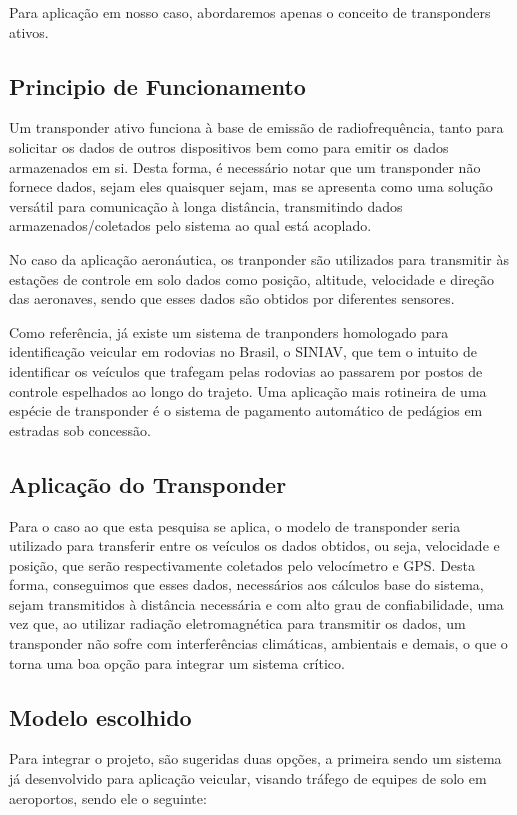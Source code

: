 Para aplicação em nosso caso, abordaremos apenas o conceito de transponders ativos.

\subsection{Principio de Funcionamento}
\label{subs:Principio de Funcionamento}

Um transponder ativo funciona à base de emissão de radiofrequência, tanto para solicitar os dados de outros dispositivos bem como para emitir os dados armazenados em si. Desta forma, é necessário notar que um transponder não fornece dados, sejam eles quaisquer sejam, mas se apresenta como uma solução versátil para comunicação à longa distância, transmitindo dados armazenados/coletados pelo sistema ao qual está acoplado.

  No caso da aplicação aeronáutica, os tranponder são utilizados para transmitir às estações de controle em solo dados como posição, altitude, velocidade e direção das aeronaves, sendo que esses dados são obtidos por diferentes sensores.

  Como referência, já existe um sistema de tranponders homologado para identificação veicular em rodovias no Brasil, o SINIAV, que tem o intuito de identificar os veículos que trafegam pelas rodovias ao passarem por postos de controle espelhados ao longo do trajeto. Uma aplicação mais rotineira de uma espécie de transponder é o sistema de pagamento automático de pedágios em estradas sob concessão.

\subsection{Aplicação do Transponder}
\label{subs:Aplicação do Transponder}
Para o caso ao que esta pesquisa se aplica, o modelo de transponder seria utilizado para transferir entre os veículos os dados obtidos, ou seja, velocidade e posição, que serão respectivamente coletados pelo velocímetro e GPS. Desta forma, conseguimos que esses dados, necessários aos cálculos base do sistema, sejam transmitidos à distância necessária e com alto grau de confiabilidade, uma vez que, ao utilizar radiação eletromagnética para transmitir os dados, um transponder não sofre com interferências climáticas, ambientais e demais, o que o torna uma boa opção para integrar um sistema crítico.

\subsection{Modelo escolhido}
\label{subs:Modelo escolhido}
Para integrar o projeto, são sugeridas duas opções, a primeira sendo um sistema já desenvolvido para aplicação veicular, visando tráfego de equipes de solo em aeroportos, sendo ele o seguinte:

